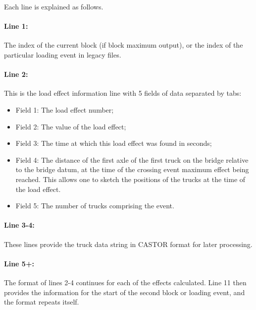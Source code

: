 \documentclass[
]{article}
\begin{document}
Each line is explained as follows.

\paragraph*{Line 1:}\label{line-1-1}

The index of the current block (if block maximum output), or the index
of the particular loading event in legacy files.

\paragraph*{Line 2:}\label{line-2-1}

This is the load effect information line with 5 fields of data separated
by tabs:

\begin{itemize}
\item
  Field 1: The load effect number;
\item
  Field 2: The value of the load effect;
\item
  Field 3: The time at which this load effect was found in seconds;
\item
  Field 4: The distance of the first axle of the first truck on the
  bridge relative to the bridge datum, at the time of the crossing event
  maximum effect being reached. This allows one to sketch the positions
  of the trucks at the time of the load effect.
\item
  Field 5: The number of trucks comprising the event.
\end{itemize}

\paragraph*{Line 3-4:}\label{line-3-4}

These lines provide the truck data string in CASTOR format for later
processing.

\paragraph*{Line 5+:}\label{line-5-1}

The format of lines 2-4 continues for each of the effects calculated.
Line 11 then provides the information for the start of the second block
or loading event, and the format repeats itself.
\end{document}
